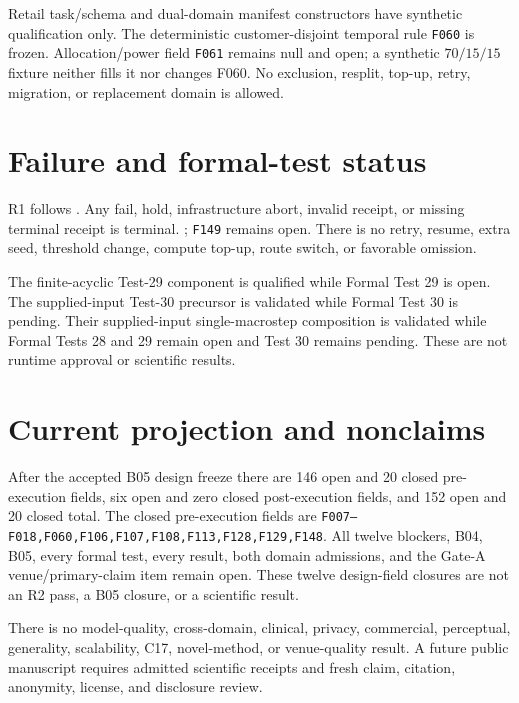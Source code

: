 \documentclass[11pt]{article}
\newcommand{\state}[1]{\texttt{#1}}
\begin{document}
Retail task/schema and dual-domain manifest constructors have synthetic
qualification only. The deterministic customer-disjoint temporal rule
\state{F060} is frozen. Allocation/power field \state{F061} remains null and
open; a synthetic $70/15/15$ fixture neither fills it nor changes F060.
No exclusion, resplit, top-up, retry, migration, or replacement domain is
allowed.

\section{Failure and formal-test status}

R1 follows
.
Any fail, hold, infrastructure abort, invalid receipt, or missing terminal
receipt is terminal. ;
\state{F149} remains open. There is no retry, resume, extra seed, threshold
change, compute top-up, route switch, or favorable omission.

The finite-acyclic Test-29 component is qualified while Formal Test 29 is open.
The supplied-input Test-30 precursor is validated while Formal Test 30 is
pending. Their supplied-input single-macrostep composition is validated while
Formal Tests 28 and 29 remain open and Test 30 remains pending. These are not
runtime approval or scientific results.

\section{Current projection and nonclaims}

After the accepted B05 design freeze there are 146 open and 20 closed
pre-execution fields, six open and zero closed post-execution fields, and 152
open and 20 closed total. The closed pre-execution fields are
\state{F007--F018,F060,F106,F107,F108,F113,F128,F129,F148}. All twelve
blockers, B04, B05, every formal test, every result, both domain admissions,
and the Gate-A venue/primary-claim item remain open. These twelve design-field
closures are not an R2 pass, a B05 closure, or a scientific result.

There is no model-quality, cross-domain, clinical, privacy, commercial,
perceptual, generality, scalability, C17, novel-method, or venue-quality
result. A future public manuscript requires admitted scientific receipts and
fresh claim, citation, anonymity, license, and disclosure review.
\end{document}
